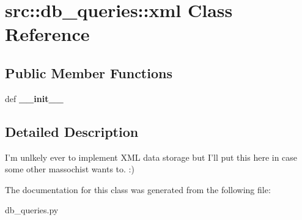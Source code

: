 \hypertarget{classsrc_1_1db__queries_1_1xml}{
\section{src::db\_\-queries::xml Class Reference}
\label{classsrc_1_1db__queries_1_1xml}
}
\subsection*{Public Member Functions}
\begin{DoxyCompactItemize}
\item 
\hypertarget{classsrc_1_1db__queries_1_1xml_af102d5adc8b513ddc5269f14322a8a96}{
def {\bfseries \_\-\_\-init\_\-\_\-}}
\label{classsrc_1_1db__queries_1_1xml_af102d5adc8b513ddc5269f14322a8a96}

\end{DoxyCompactItemize}


\subsection{Detailed Description}
\begin{DoxyVerb}
I'm unlkely ever to implement XML data storage but I'll put this here
in case some other massochist wants to. :)
\end{DoxyVerb}
 

The documentation for this class was generated from the following file:\begin{DoxyCompactItemize}
\item 
db\_\-queries.py\end{DoxyCompactItemize}
